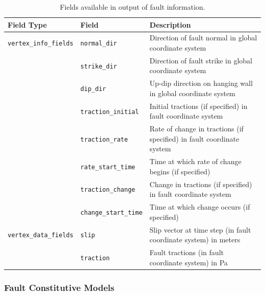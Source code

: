 \begin{table}[htbp]
\caption{Fields available in output of fault information.}
\label{tab:fault:dyn:output}
\begin{tabular}{llp{3.5in}}
\textbf{Field Type} & \textbf{Field} & \textbf{Description}\\
\hline 
\texttt{vertex\_info\_fields} & \texttt{normal\_dir} & Direction of fault normal in global coordinate system\\
 & \texttt{strike\_dir} & Direction of fault strike in global coordinate system\\
 & \texttt{dip\_dir} & Up-dip direction on hanging wall in global coordinate
system\\
 & \texttt{traction\_initial} & Initial tractions (if specified) in fault coordinate
system\\
 & \texttt{traction\_rate} & Rate of change in tractions (if specified) in fault
coordinate system\\
 & \texttt{rate\_start\_time} & Time at which rate of change begins (if specified)\\
 & \texttt{traction\_change} & Change in tractions (if specified) in fault coordinate
system\\
 & \texttt{change\_start\_time} & Time at which change occurs (if specified)\\
\hline 
\texttt{vertex\_data\_fields} & \texttt{slip} & Slip vector at time step (in fault coordinate system)
in meters\\
 & \texttt{traction} & Fault tractions (in fault coordinate system) in Pa\\
\hline 
\end{tabular}
\end{table}


\subsubsection{Fault Constitutive Models}
\label{sec:fault:constitutive:models}

